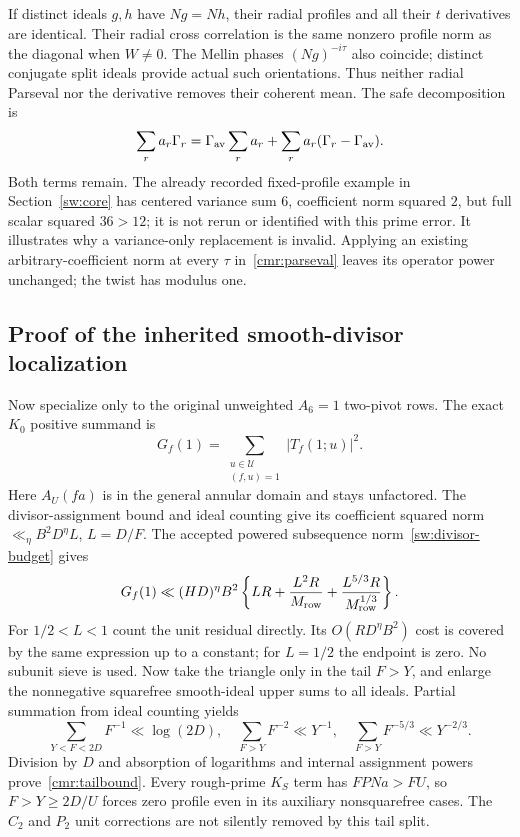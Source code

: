 If distinct ideals $g,h$ have $Ng=Nh$, their radial profiles and all
their $t$ derivatives are identical. Their radial cross correlation
is the same nonzero profile norm as the diagonal when $W\ne0$.
The Mellin phases $(Ng)^{-i\tau}$ also coincide; distinct conjugate
split ideals provide actual such orientations. Thus neither radial
Parseval nor the derivative removes their coherent mean.
The safe decomposition is
\[
 \sum_r a_r\Gamma_r
   =\Gamma_{\rm av}\sum_ra_r
                 +\sum_ra_r(\Gamma_r-\Gamma_{\rm av}).
\]
Both terms remain. The already recorded fixed-profile example in
Section~\ref{sw:core} has centered variance sum $6$, coefficient norm
squared $2$, but full scalar squared $36>12$; it is not rerun or
identified with this prime error. It illustrates why a variance-only
replacement is invalid. Applying an existing arbitrary-coefficient
norm at every $\tau$ in~\eqref{cmr:parseval} leaves its operator
power unchanged; the twist has modulus one.

\subsection{Proof of the inherited smooth-divisor localization}
\label{cmr:tail-proof}
Now specialize only to the original unweighted $A_6=1$ two-pivot
rows. The exact $K_0$ positive summand is
\[
 G_f(1)=\sum_{\substack{u\in\mathcal U\\(f,u)=1}}
             |T_f(1;u)|^2.
\]
Here $A_U(fa)$ is in the general annular domain and stays unfactored.
The divisor-assignment bound and ideal counting give its coefficient
squared norm $\ll_\eta B^2D^\eta L$, $L=D/F$.
The accepted powered subsequence norm~\eqref{sw:divisor-budget} gives
\[
 G_f(1)\ll(HD)^\eta B^2
 \left\{LR+\frac{L^2R}{M_{\rm row}}
              +\frac{L^{5/3}R}{M_{\rm row}^{1/3}}\right\}.
\]
For $1/2<L<1$ count the unit residual directly. Its
$O(RD^\eta B^2)$ cost is covered by the same expression up to a
constant; for $L=1/2$ the endpoint is zero. No subunit sieve is used.
Now take the triangle only in the tail $F>Y$, and enlarge the
nonnegative squarefree smooth-ideal upper sums to all ideals.
Partial summation from ideal counting yields
\[
 \sum_{Y<F<2D}F^{-1}\ll\log(2D),\quad
 \sum_{F>Y}F^{-2}\ll Y^{-1},\quad
 \sum_{F>Y}F^{-5/3}\ll Y^{-2/3}.
\]
Division by $D$ and absorption of logarithms and internal assignment
powers prove~\eqref{cmr:tailbound}. Every rough-prime $K_S$ term has
$FPNa>FU$, so $F>Y\ge2D/U$ forces zero profile even in its auxiliary
nonsquarefree cases. The $C_2$ and $P_2$ unit corrections are not
silently removed by this tail split.

